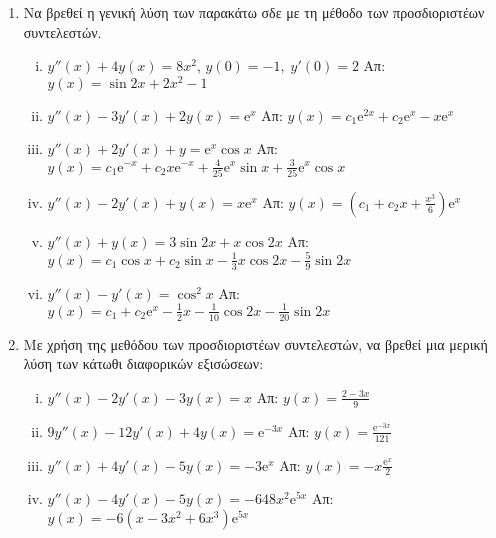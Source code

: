 \begin{enumerate}
  \item Να βρεθεί η γενική λύση των παρακάτω σδε με τη μέθοδο των προσδιοριστέων 
    συντελεστών.
    \begin{enumerate}[i)]
      \item $ y''(x)+4y(x)=8x^{2} $, \quad $ y(0)=-1, \; y'(0)=2 $ 
        \hfill Απ: $ y(x)= \sin{2x} + 2x^{2}-1 $ 
      \item $ y''(x)-3y'(x)+2y(x)= \mathrm{e}^{x} $
        \hfill Απ: $ y(x)= c_{1} \mathrm{e}^{2x} + c_{2} \mathrm{e}^{x} - x
        \mathrm{e}^{x}  $ 
      \item $ y''(x) +2y'(x)+y= \mathrm{e}^{x} \cos{x} $
        \hfill Απ: $ y(x)= c_{1} \mathrm{e}^{-x} + c_{2}x \mathrm{e}^{-x} +
        \frac{4}{25} \mathrm{e}^{x} \sin{x} + \frac{3}{25} \mathrm{e}^{x} \cos{x} $  
      \item $y''(x)-2y'(x)+y(x)=x\mathrm{e}^{x}$ 
        \hfill Απ:  $y(x)=(c_{1}+c_{2}x+\frac{x^{3}}{6})\mathrm{e}^{x}$
      \item $y''(x)+y(x)=3\sin 2x + x\cos 2x$ 
        \hfill Απ: $y(x)=c_{1}\cos x+c_{2}\sin x-\frac{1}{3}x\cos 2x-\frac{5}{9}\sin 2x $
      \item $y''(x)-y'(x)=\cos^{2}x$ 
        \hfill Απ: $y(x) =c_{1}+c_{2}\mathrm{e}^{x}-\frac{1}{2}x-\frac{1}{10}\cos 2x- 
        \frac{1}{20}\sin 2x$
    \end{enumerate}

  \item Με χρήση της μεθόδου των προσδιοριστέων συντελεστών, να βρεθεί μια μερική 
    λύση των κάτωθι διαφορικών εξισώσεων:
    \begin{enumerate}[i)]
      \item $y''(x)-2y'(x)-3y(x)=x$ \hfill Απ: $y(x)=\frac{2-3x}{9}$
      \item $9y''(x)-12y'(x)+4y(x)=\mathrm{e}^{-3x}$ 
        \hfill Απ: $y(x)=\frac{\mathrm{e}^{-3x}}{121}$
      \item $y''(x)+4y'(x)-5y(x)=-3\mathrm{e}^{x}$ 
        \hfill Απ: $y(x)=-x\frac{\mathrm{e}^{x}}{2}$
      \item $y''(x)-4y'(x)-5y(x)=-648x^{2}\mathrm{e}^{5x}$ 
        \hfill Απ: $ y(x)=-6(x-3x^{2}+6x^{3})\mathrm{e}^{5x}$
    \end{enumerate}


\end{enumerate}
